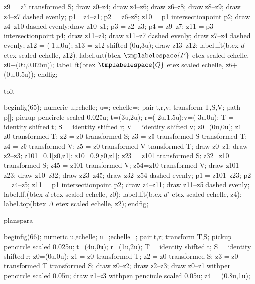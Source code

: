 {{{\begin{mplibcode}[PfLAI]
				z9 = z7 transformed S;
				draw z0--z4;
				draw z4--z6;
				draw z6--z8;
				draw z8--z9;
				draw z4--z7 dashed evenly;
				p1= z4--z1;
				p2 = z6--z8;
				z10 = p1 intersectionpoint p2;
				draw z4--z10 dashed evenly;draw z10--z1;
				p3 = z2--z3;
				p4 = z9--z7;
				z11 = p3 intersectionpoint p4;
				draw z11--z9;
				draw z11--z7 dashed evenly;
				draw z7--z4 dashed evenly;
				z12 = (-1u,0u);
				z13 = z12 shifted (0u,3u);
				draw z13--z12;
				label.lft(btex $d$ etex scaled echelle, z12);
				label.urt(btex $\tmplabelespace{P}$ etex scaled echelle, z0+(0u,0.025u));
				label.lft(btex $\tmplabelespace{Q}$ etex scaled echelle, z6+(0u,0.5u));
				endfig;
			\end{mplibcode}
		}%
		{toit}{%
			\begin{mplibcode}[PfLAJ]
				beginfig(65);
				numeric u,echelle;
				u=\scaleminischemspace*1cm;
				echelle=\scaleminischemspace;
				pair t,r,v;
				transform T,S,V;
				path p[];
				pickup pencircle scaled 0.025u;
				t=(3u,2u); r=(-2u,1.5u);v=(-3u,0u); 
				T = identity shifted t;
				S = identity shifted r;
				V = identity shifted v;
				z0=(0u,0u);
				z1 = z0 transformed T;
				z2 = z0 transformed S;
				z3 = z0 transformed S transformed T;
				z4 = z0 transformed V;
				z5 = z0 transformed V transformed T;
				draw z0--z1;
				draw z2--z3;
				z101=0.1[z0,z1]; z10=0.9[z0,z1];
				z23 = z101 transformed S;
				z32=z10 transformed S;
				z45 = z101 transformed V;
				z54=z10 transformed V;
				draw z101--z23;
				draw z10--z32;
				draw z23--z45;
				draw z32--z54 dashed evenly;
				p1 = z101--z23;
				p2 = z4--z5;
				z11 = p1 intersectionpoint p2;
				draw z4--z11;
				draw z11--z5 dashed evenly;
				label.lft(btex $d$ etex scaled echelle, z0);
				label.lft(btex $d'$ etex scaled echelle, z4);
				label.top(btex $\Delta$ etex scaled echelle, z2);
				endfig;
			\end{mplibcode}
		}%
		{planspara}{%
			\begin{mplibcode}[PfLAK]
				beginfig(66);
				numeric u,echelle;
				u=\scaleminischemspace*1cm;echelle=\scaleminischemspace;
				pair t,r;
				transform T,S;
				pickup pencircle scaled 0.025u;
				t=(4u,0u); r=(1u,2u);
				T = identity shifted t;
				S = identity shifted r;
				z0=(0u,0u);
				z1 = z0 transformed T;
				z2 = z0 transformed S;
				z3 = z0 transformed T transformed S;
				draw z0--z2;
				draw z2--z3;
				draw z0--z1 withpen pencircle scaled 0.05u;
				draw z1--z3 withpen pencircle scaled 0.05u;
				z4 = (0.8u,1u);

\end{mplibcode}}}}
